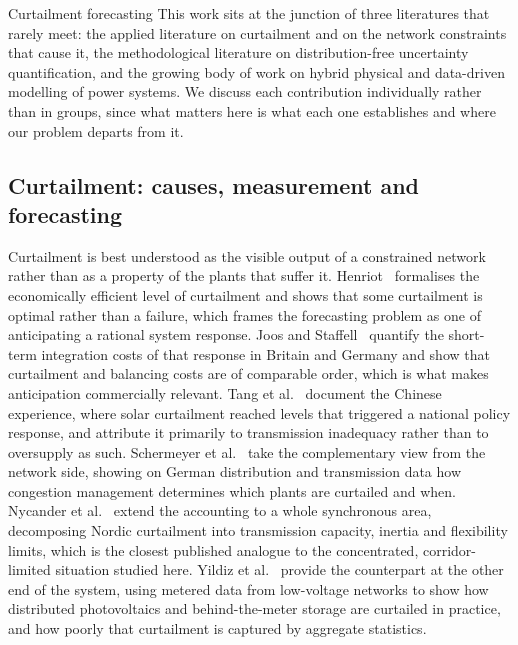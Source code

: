 \documentclass[preprint,3p,times]{elsarticle}
\providecommand{\DIFaddtex}[1]{{\protect\color{blue} \sf #1}} %
\providecommand{\DIFdeltex}[1]{{\protect\color{red} \scriptsize #1}} %
\providecommand{\DIFaddbegin}{} %
\providecommand{\DIFdelbegin}{} %
\providecommand{\DIFdelend}{} %
\providecommand{\DIFadd}[1]{\texorpdfstring{\DIFaddtex{#1}}{#1}} %
\providecommand{\DIFdel}[1]{\texorpdfstring{\DIFdeltex{#1}}{}} %
\begin{document}
\DIFdelbegin \DIFdel{Curtailment forecasting }\DIFdelend \DIFaddbegin \DIFadd{This work sits at the junction of three literatures that rarely meet: the applied literature on curtailment and on the network constraints that cause it, the methodological literature on distribution-free uncertainty quantification, and the growing body of work on hybrid physical and data-driven modelling of power systems. We discuss each contribution individually rather than in groups, since what matters here is what each one establishes and where our problem departs from it.
}

\subsection{Curtailment: causes, measurement and forecasting}

\DIFadd{Curtailment is best understood as the visible output of a constrained network rather than as a property of the plants that suffer it. Henriot~\cite{henriot2015} formalises the economically efficient level of curtailment and shows that some curtailment is optimal rather than a failure, which frames the forecasting problem as one of anticipating a rational system response. Joos and Staffell~\cite{joos2018} quantify the short-term integration costs of that response in Britain and Germany and show that curtailment and balancing costs are of comparable order, which is what makes anticipation commercially relevant. Tang et al.~\cite{tang2018} document the Chinese experience, where solar curtailment reached levels that triggered a national policy response, and attribute it primarily to transmission inadequacy rather than to oversupply as such. Schermeyer et al.~\cite{schermeyer2018} take the complementary view from the network side, showing on German distribution and transmission data how congestion management determines which plants are curtailed and when. Nycander et al.~\cite{nycander2020} extend the accounting to a whole synchronous area, decomposing Nordic curtailment into transmission capacity, inertia and flexibility limits, which is the closest published analogue to the concentrated, corridor-limited situation studied here. Yildiz et al.~\cite{yildiz2023} provide the counterpart at the other end of the system, using metered data from low-voltage networks to show how distributed photovoltaics and behind-the-meter storage are curtailed in practice, and how poorly that curtailment is captured by aggregate statistics.
}
\end{document}
